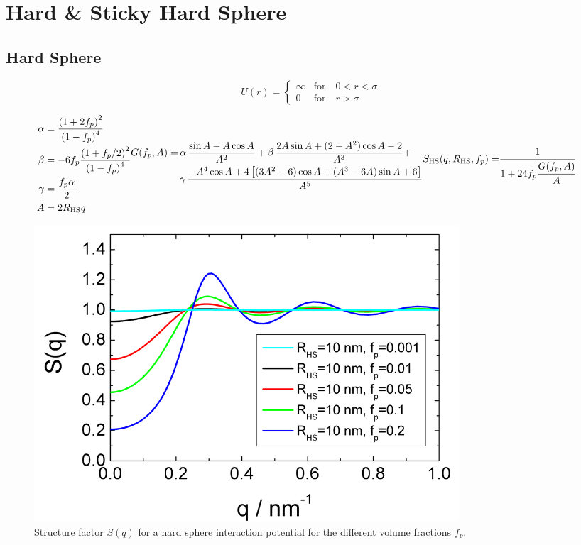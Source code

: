 \clearpage
\section{Hard \& Sticky Hard Sphere}
\subsection{Hard Sphere} \cite{Percus1958,Vrij1979}

\begin{equation}
U(r) =
 \begin{cases}
      \infty    & \text{for} \quad 0<r<\sigma \\
      0         & \text{for} \quad r>\sigma
   \end{cases}
\end{equation}

\begin{subequations}
\begin{align}
\alpha &= \frac{\left(1+2f_p\right)^2}{\left(1-f_p\right)^4} \\
\beta  &= -6 f_p \frac{\left(1 +f_p/2 \right)^2}{\left(1-f_p\right)^4} \\
\gamma &= \frac{f_p \alpha}{2}  \\
A &= 2 R_\text{HS} q
\end{align}

\begin{align}
G(f_p,A) =  & \, \alpha \, \frac{\sin A -A \cos A }{A^2} + \beta \, \frac{2 A \sin A +(2-A^2) \cos A -2}{A^3} + \nonumber \\
    & \, \gamma  \, \frac{-A^4 \cos A + 4\left[(3A^2-6)\cos A+(A^3-6A)\sin A+6\right]}{A^5}
\end{align}
\begin{align}
S_\text{HS}(q,R_\text{HS},f_p)  = & \cfrac{1}{1+24 f_p
\cfrac{G(f_p,A)}{A}}
\end{align}
\end{subequations}


\begin{figure}[htb]
\begin{center}
\includegraphics[width=0.768\textwidth,height=0.528\textwidth]{../images/structure_factor/HardSphere/HardSphereSQ.png}
\end{center}
\caption{Structure factor $S(q)$ for a hard sphere interaction potential for the different volume fractions $f_p$.}
\label{fig:SQHardSphere}
\end{figure}


